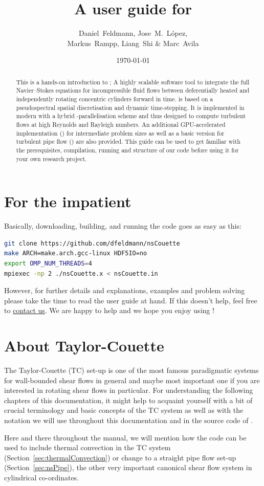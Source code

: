 \documentclass[a4paper, 11pt, DIV=11]{scrartcl}
\title{A user guide for \nsc}
\author{Daniel~Feldmann, Jose~M.~L\'opez,\\ Markus~Rampp, Liang~Shi \& Marc~Avila}
\date{\today}
\begin{document}
\maketitle

\begin{abstract}
This is a hands-on introduction to \nsc; A highly scalable software tool
to integrate the full Navier--Stokes equations for incompressible fluid
flows between deferentially heated and independently rotating concentric
cylinders forward in time. \nsc is based on a pseudospectral spatial
discretisation and dynamic time-stepping. It is implemented in modern
\fortran with a hybrid \mpi-\omp parallelisation scheme and thus designed
to compute turbulent flows at high Reynolds and Rayleigh numbers. An
additional GPU-accelerated implementation (\cuda) for intermediate problem
sizes as well as a basic version for turbulent pipe flow (\nsp) are also
provided. This guide can be used to get familiar with the prerequisites,
compilation, running and structure of our code before using it for your
own research project.
\end{abstract}
\tableofcontents

\section{For the impatient}
\label{sec:forTheImpatient}

Basically, downloading, building, and running the code goes as easy as this: 
\begin{lstlisting}[language=bash]
git clone https://github.com/dfeldmann/nsCouette
make ARCH=make.arch.gcc-linux HDF5IO=no
export OMP_NUM_THREADS=4
mpiexec -np 2 ./nsCouette.x < nsCouette.in
\end{lstlisting}
However, for further details and explanations, examples and problem solving
please take the time to read the user guide at hand. If this doesn't help,
feel free to \href{mailto:nsCouette@zarm.uni-bremen.de}{contact us}. We are
happy to help and we hope you enjoy using \nsc!

\section{About Taylor-Couette}
\label{sec:taylorCouette}

The Taylor-Couette (TC) set-up is one of the most famous paradigmatic systems
for wall-bounded shear flows in general and maybe  most important
one if you are interested in rotating shear flows in particular. For
understanding the following chapters of this documentation, it might help
to acquaint yourself with a bit of crucial terminology and basic
concepts of the TC system as well as with the notation we will use throughout
this documentation and in the source code of \nsc.
\par
Here and there throughout the manual, we will mention how the code can be used to
include thermal convection in the TC system (Section~\ref{sec:thermalConvection})
or change to a straight pipe flow set-up (Section~\ref{sec:nsPipe}), the other very
important canonical shear flow system in cylindrical co-ordinates.
\end{document}
